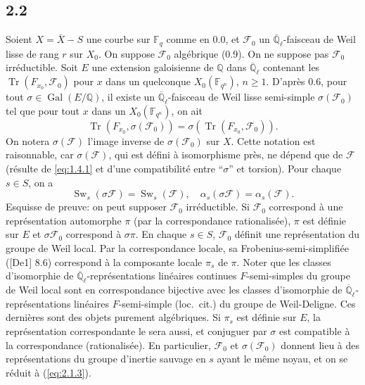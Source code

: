 \documentclass[11pt,a4paper]{article}
\theoremstyle{plain}
\theoremstyle{definition}
\DeclareMathOperator{\Gal}{Gal}
\DeclareMathOperator{\Sw}{Sw}
\DeclareMathOperator{\tr}{Tr}
\begin{document}
\subsection{2.2}

Soient $X = \bar{X} - S$ une courbe sur $\mathbb{F}_q$ comme en 0.0, et $\mathcal{F}_0$ un $\overline{\mathbb{Q}}_\ell$-faisceau de Weil lisse de rang $r$ sur $X_0$. On suppose $\mathcal{F}_0$ alg\'ebrique (0.9). On ne suppose pas $\mathcal{F}_0$ irr\'eductible. Soit $E$ une extension galoisienne de $\mathbb{Q}$ dans $\overline{\mathbb{Q}}_\ell$ contenant les $\tr(F_{x_0}, \mathcal{F}_0)$ pour $x$ dans un quelconque $X_0(\mathbb{F}_{q^n})$, $n \geq 1$. D'apr\`es 0.6, pour tout $\sigma \in \Gal(E/\mathbb{Q})$, il existe un $\overline{\mathbb{Q}}_\ell$-faisceau de Weil lisse semi-simple $\sigma(\mathcal{F}_0)$ tel que pour tout $x$ dans un $X_0(\mathbb{F}_{q^n})$, on ait
\[
\tr(F_{x_0}, \sigma(\mathcal{F}_0)) = \sigma(\tr(F_{x_0}, \mathcal{F}_0)).
\]
On notera $\sigma(\mathcal{F})$ l'image inverse de $\sigma(\mathcal{F}_0)$ sur $X$. Cette notation est raisonnable, car $\sigma(\mathcal{F})$, qui est d\'efini \`a isomorphisme pr\`es, ne d\'epend que de $\mathcal{F}$ (r\'esulte de \ref{eq:1.4.1} et d'une compatibilit\'e entre ``$\sigma$'' et torsion). Pour chaque $s \in S$, on a
\begin{equation}\label{eq:2.2.1}
\Sw_s(\sigma \mathcal{F}) = \Sw_s(\mathcal{F}), \quad \alpha_s(\sigma \mathcal{F}) = \alpha_s(\mathcal{F}).
\end{equation}
Esquisse de preuve: on peut supposer $\mathcal{F}_0$ irr\'eductible. Si $\mathcal{F}_0$ correspond \`a une repr\'esentation automorphe $\pi$ (par la correspondance rationalis\'ee), $\pi$ est d\'efinie sur $E$ et $\sigma \mathcal{F}_0$ correspond \`a $\sigma \pi$. En chaque $s \in S$, $\mathcal{F}_0$ d\'efinit une repr\'esentation du groupe de Weil local. Par la correspondance locale, sa Frobenius-semi-simplifi\'ee ([De1] 8.6) correspond \`a la composante locale $\pi_s$ de $\pi$. Noter que les classes d'isomorphie de $\overline{\mathbb{Q}}_\ell$-repr\'esentations lin\'eaires continues $F$-semi-simples du groupe de Weil local sont en correspondance bijective avec les classes d'isomorphie de $\overline{\mathbb{Q}}_\ell$-repr\'esentations lin\'eaires $F$-semi-simple (loc.~cit.) du groupe de Weil-Deligne. Ces derni\`eres sont des objets purement alg\'ebriques. Si $\pi_s$ est d\'efinie sur $E$, la repr\'esentation correspondante le sera aussi, et conjuguer par $\sigma$ est compatible \`a la correspondance (rationalis\'ee). En particulier, $\mathcal{F}_0$ et $\sigma(\mathcal{F}_0)$ donnent lieu \`a des repr\'esentations du groupe d'inertie sauvage en $s$ ayant le m\^eme noyau, et on se r\'eduit \`a (\ref{eq:2.1.3}).
\end{document}
